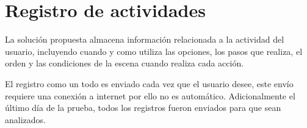 \section{Registro de actividades}

La solución propuesta almacena información relacionada a la actividad del
usuario, incluyendo cuando y como utiliza las opciones, los pasos que realiza,
el orden y las condiciones de la escena cuando realiza cada acción.

El registro como un todo es enviado cada vez que el usuario desee, este envío
requiere una conexión a internet por ello no es automático. Adicionalmente el
último día de la prueba, todos los registros fueron enviados para que sean
analizados.


